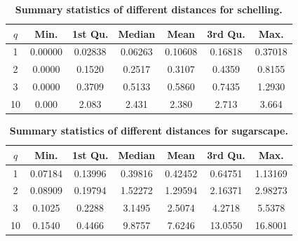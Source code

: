 \documentclass{JASSS}
\begin{document}




\begin{table}[!t]
	
	\centering
	\begin{tabular}{|c|cccccc|}
	\hline
    	$q$ & Min. & 1st Qu. & Median & Mean & 3rd Qu. & Max. \\\hline
        1 & 0.00000 & 0.02838 & 0.06263 & 0.10608 & 0.16818 & 0.37018 \\
        2 & 0.0000 & 0.1520 & 0.2517 & 0.3107 & 0.4359 & 0.8155 \\
        3 & 0.0000 & 0.3709 & 0.5133 & 0.5860 & 0.7435 & 1.2930 \\
        10 & 0.000 & 2.083 & 2.431 & 2.380 & 2.713 & 3.664 \\\hline
    \end{tabular}
    \caption{\textbf{Summary statistics of different distances for schelling.}}\label{tab:schellingdistances}
\end{table}

\begin{table}[!t]
	
	\centering
	\begin{tabular}{|c|cccccc|}
	\hline
    	$q$ & Min. & 1st Qu. & Median & Mean & 3rd Qu. & Max. \\\hline
        1 & 0.07184 & 0.13996 & 0.39816 & 0.42452 & 0.64751 & 1.13169\\
        2 & 0.08909 & 0.19794 & 1.52272 & 1.29594 & 2.16371 & 2.98273\\
        3 & 0.1025 & 0.2288 & 3.1495 & 2.5074 & 4.2718 & 5.5378\\
        10 & 0.1540 & 0.4466 & 9.8757 & 7.6246 & 13.0550 & 16.8001\\\hline
    \end{tabular}
    \caption{\textbf{Summary statistics of different distances for sugarscape.}}\label{tab:sugarscapedistances}
\end{table}
\end{document}
